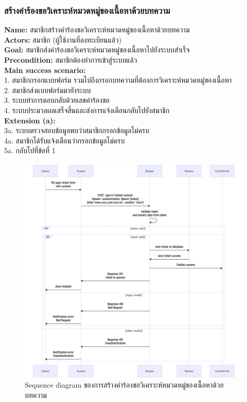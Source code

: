 \documentclass[12pt,oneside,openright,a4paper]{cpe-thai-project}
\begin{document}
\subsubsection{สร้างคำร้องขอวิเคราะห์หมวดหมู่ของเนื้อหาด้วยบทความ}
\textbf{Name: }สมาชิกสร้างคำร้องขอวิเคราะห์หมวดหมู่ของเนื้อหาด้วยบทความ \\
\textbf{Actors: }สมาชิก (ผู้ใช้งานที่ลงทะเบียนแล้ว) \\
\textbf{Goal: }สมาชิกส่งคำร้องขอวิเคราะห์หมวดหมู่ของเนื้อหาไปยังระบบสำเร็จ \\
\textbf{Precondition: }สมาชิกต้องทำการเข้าสู่ระบบแล้ว \\
\textbf{Main success scenario: } \\
  \hspace*{0.5cm}1. สมาชิกกรอกแบบฟอร์ม รวมไปถึงกรอกบทความที่ต้องการวิเคราะห์หมวดหมู่ของเนื้อหา \\
  \hspace*{0.5cm}2. สมาชิกส่งแบบฟอร์มมายังระบบ \\
  \hspace*{0.5cm}3. ระบบทำการตอบกลับด้วยเลขคำร้องขอ \\
  \hspace*{0.5cm}4. ระบบประมวลผลเสร็จสิ้นและส่งการแจ้งเตือนกลับไปยังสมาชิก \\
\textbf{Extension (a): } \\
  \hspace*{0.5cm}3a. ระบบตรวจสอบข้อมูลพบว่าสมาชิกกรอกข้อมูลไม่ครบ \\
  \hspace*{0.5cm}4a. สมาชิกได้รับแจ้งเตือนว่ากรอกข้อมูลไม่ครบ \\
  \hspace*{0.5cm}5a. กลับไปที่ข้อที่ 1 \newpage
\begin{figure}[!ht]\centering
  \includegraphics[width=\textwidth]{./img/seq_content.png}
  \caption{Sequence diagram ของการสร้างคำร้องขอวิเคราะห์หมวดหมู่ของเนื้อหาด้วยบทความ}\label{fig:seq_content} 
\end{figure} 
\end{document}
